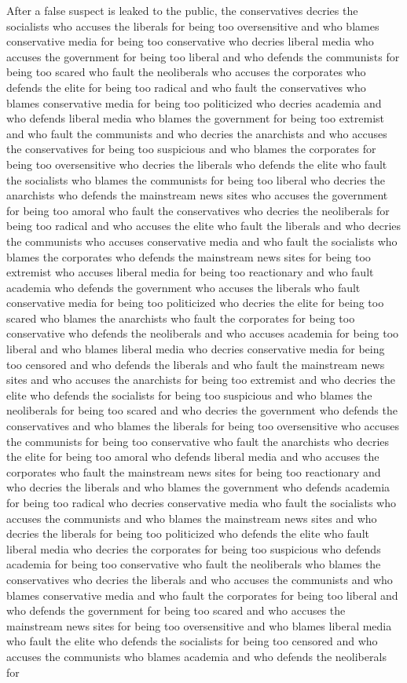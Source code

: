 \documentclass{report}
\begin{document}
After a false suspect is leaked to the public, the conservatives decries the socialists who accuses the liberals for being too oversensitive and who blames conservative media for being too conservative who decries liberal media who accuses the government for being too liberal and who defends the communists for being too scared who fault the neoliberals who accuses the corporates who defends the elite for being too radical and who fault the conservatives who blames conservative media for being too politicized who decries academia and who defends liberal media who blames the government for being too extremist and who fault the communists and who decries the anarchists and who accuses the conservatives for being too suspicious and who blames the corporates for being too oversensitive who decries the liberals who defends the elite who fault the socialists who blames the communists for being too liberal who decries the anarchists who defends the mainstream news sites who accuses the government for being too amoral who fault the conservatives who decries the neoliberals for being too radical and who accuses the elite who fault the liberals and who decries the communists who accuses conservative media and who fault the socialists who blames the corporates who defends the mainstream news sites for being too extremist who accuses liberal media for being too reactionary and who fault academia who defends the government who accuses the liberals who fault conservative media for being too politicized who decries the elite for being too scared who blames the anarchists who fault the corporates for being too conservative who defends the neoliberals and who accuses academia for being too liberal and who blames liberal media who decries conservative media for being too censored and who defends the liberals and who fault the mainstream news sites and who accuses the anarchists for being too extremist and who decries the elite who defends the socialists for being too suspicious and who blames the neoliberals for being too scared and who decries the government who defends the conservatives and who blames the liberals for being too oversensitive who accuses the communists for being too conservative who fault the anarchists who decries the elite for being too amoral who defends liberal media and who accuses the corporates who fault the mainstream news sites for being too reactionary and who decries the liberals and who blames the government who defends academia for being too radical who decries conservative media who fault the socialists who accuses the communists and who blames the mainstream news sites and who decries the liberals for being too politicized who defends the elite who fault liberal media who decries the corporates for being too suspicious who defends academia for being too conservative who fault the neoliberals who blames the conservatives who decries the liberals and who accuses the communists and who blames conservative media and who fault the corporates for being too liberal and who defends the government for being too scared and who accuses the mainstream news sites for being too oversensitive and who blames liberal media who fault the elite who defends the socialists for being too censored and who accuses the communists who blames academia and who defends the neoliberals for 
\end{document}
